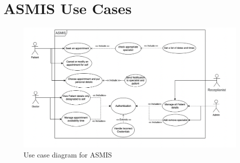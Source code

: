 \chapter{ASMIS Use Cases}

\begin{figure}[h!]
\centering
\includegraphics[width=\textwidth]{pics/usecase.png}
\caption{Use case diagram for ASMIS}\label{fig:usecase}
\end{figure}


